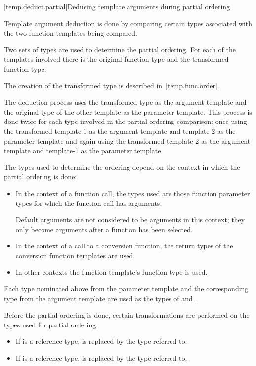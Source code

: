 [temp.deduct.partial]{Deducing template arguments during partial ordering}

\pnum
Template argument deduction is done by comparing certain types associated with
the two function templates being compared.

\pnum
Two sets of types are used to determine the partial ordering.  For each of
the templates involved there is the original function type and the
transformed function type.
\begin{note}
The creation of the transformed type is described in~\ref{temp.func.order}.
\end{note}
The deduction process uses the
transformed type as the argument template and the original type of the
other template as the parameter template.  This process is done twice
for each type involved in the partial ordering comparison: once using
the transformed template-1 as the argument template and template-2 as
the parameter template and again using the transformed template-2 as
the argument template and template-1 as the parameter template.

\pnum
The types used to determine the ordering depend on the context in which
the partial ordering is done:

\begin{itemize}
\item
In the context of a function call, the types used are those function parameter types
for which the function call has arguments.
\begin{footnote}
Default arguments
are not considered to be arguments in this context; they only become arguments
after a function has been selected.
\end{footnote}
\item
In the context of a call to a conversion function, the return types of
the conversion function templates are used.
\item
In other contexts the function template's function
type is used.
\end{itemize}

\pnum
Each type nominated above from the parameter template and the corresponding type from the
argument template are used as the types of
and
.

\pnum
Before the partial ordering is done, certain transformations are performed
on the types used for partial ordering:

\begin{itemize}
\item
If
is a reference type,
is replaced by the type referred to.
\item
If
is a reference type,
is replaced by the type referred to.
\end{itemize}

